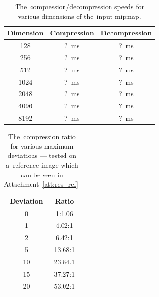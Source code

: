 \begin{table}
	\begin{center}
	\begin{tabular}{ | c | c | c | }
		\hline
		Dimension & Compression & Decompression \\ \hline
		128 & ?~ms & ?~ms  \\ \hline
		256 & ?~ms & ?~ms  \\ \hline
		512 & ?~ms & ?~ms  \\ \hline
		1024 & ?~ms & ?~ms \\ \hline
		2048 & ?~ms & ?~ms \\ \hline
		4096 & ?~ms & ?~ms \\ \hline
		8192 & ?~ms & ?~ms \\ \hline
	\end{tabular}
	\caption{The~compression/decompression speeds for various dimensions of the~input mipmap.}
	\label{tab:speeds}
\end{center}
\end{table}

\begin{table}
	\begin{center}
		\begin{tabular}{ | c | c | }
			\hline
			Deviation & Ratio \\ \hline
			0 & 1:1.06  \\ \hline
			1 & 4.02:1  \\ \hline
			2 & 6.42:1  \\ \hline
			5 & 13.68:1  \\ \hline
			10 & 23.84:1 \\ \hline
			15 & 37.27:1 \\ \hline
			20 & 53.02:1 \\ \hline
		\end{tabular}
		\caption{The~compression ratio for various maximum deviations --- tested on a~reference image which can be seen in Attachment~\ref{att:res_ref}.}
		\label{tab:ratios}
	\end{center}
\end{table}

\newcommand{\hspaceimg}{\hspace{0.05cm}}
\newcommand{\vspaceimg}{\vspace{0.15cm}}
\newcommand{\incexamplsolo}[1]{\texttt{[image: \#1]}}

